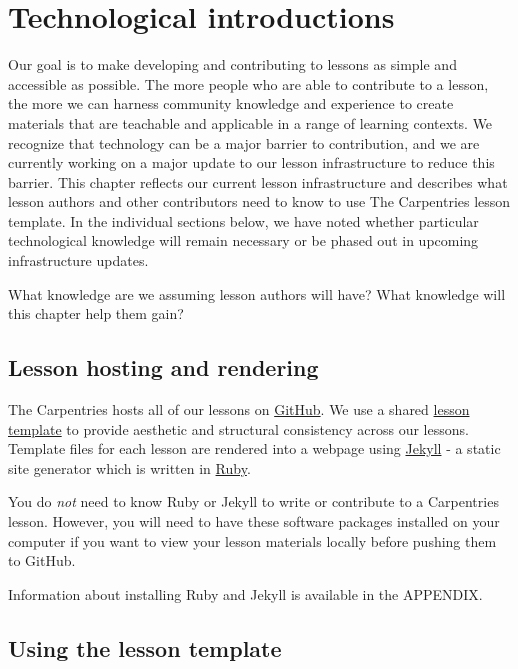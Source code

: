 \documentclass[
]{book}
\begin{document}
\hypertarget{technological-introductions}{%
\chapter{Technological introductions}\label{technological-introductions}}

Our goal is to make
developing and contributing to lessons as simple and accessible
as possible. The more people who are able to contribute to a
lesson, the more we can harness community knowledge and
experience to create materials that are teachable and applicable
in a range of learning contexts. We recognize that technology
can be a major barrier to contribution, and we are currently
working on a major update to our lesson infrastructure to reduce
this barrier. This chapter reflects our current lesson
infrastructure and describes what lesson authors and other
contributors need to know to use The Carpentries lesson template.
In the individual sections below, we have noted whether particular
technological knowledge will remain necessary or be phased out
in upcoming infrastructure updates.

What knowledge are we assuming lesson authors will have?
What knowledge will this chapter help them gain?

\hypertarget{lesson-hosting-and-rendering}{%
\section{Lesson hosting and rendering}\label{lesson-hosting-and-rendering}}

The Carpentries hosts all of our lessons on \href{https://github.com}{GitHub}. We use a
shared \href{http://carpentries.github.io/lesson-example/setup.html}{lesson template} to provide aesthetic and structural
consistency across our lessons. Template files for each lesson are
rendered into a webpage using \href{https://jekyllrb.com/}{Jekyll} -
a static site generator which is written in \href{https://www.ruby-lang.org/en/}{Ruby}.

You do \emph{not} need to know Ruby or Jekyll to write
or contribute to a Carpentries lesson. However, you will need to
have these software packages installed on your computer if you
want to view your lesson materials locally before pushing them
to GitHub.

Information about installing Ruby and Jekyll is available in the APPENDIX.

\hypertarget{using-the-lesson-template}{%
\section{Using the lesson template}\label{using-the-lesson-template}}
\end{document}

